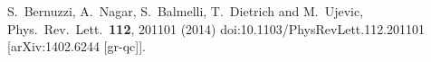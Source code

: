 \documentclass[aps,prl,onecolumn,superscriptaddress,groupedaddress,nofootinbib,floatfix,notitlepage]{revtex4-1}
\begin{document}
\begin{thebibliography}{1}

  S.~Bernuzzi, A.~Nagar, S.~Balmelli, T.~Dietrich and M.~Ujevic,
  Phys.\ Rev.\ Lett.\  {\bf 112}, 201101 (2014)
  doi:10.1103/PhysRevLett.112.201101
  [arXiv:1402.6244 [gr-qc]].

\end{thebibliography}
\end{document}

